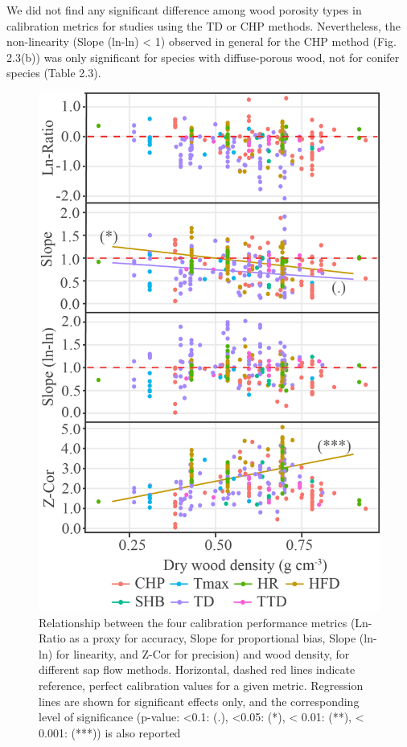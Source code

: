 \documentclass[11pt,twoside]{reedthesis}
\begin{document}
We did not find any significant difference among wood porosity types in
calibration metrics for studies using the TD or CHP methods.
Nevertheless, the non-linearity (Slope (ln-ln) \textless{} 1) observed
in general for the CHP method (Fig. 2.3(b)) was only significant for
species with diffuse-porous wood, not for conifer species (Table
2.3).\par
\begin{figure}[hbt!]

{\centering \includegraphics[width=0.55\linewidth]{figure/CH2/DENSITY} 

}

\caption[Relationship between the four calibration performance and wood density, for different sap flow methods.]{Relationship between the four calibration performance metrics (Ln-Ratio as a proxy for accuracy, Slope for proportional bias, Slope (ln-ln) for linearity, and Z-Cor for precision) and wood density, for different sap flow methods. Horizontal, dashed red lines indicate reference, perfect calibration values for a given metric. Regression lines are shown for significant effects only, and the corresponding level of significance (p-value: <0.1: (.), <0.05: (*), < 0.01: (**), < 0.001: (***)) is also reported }\label{fig:ch2fig4}
\end{figure}
\end{document}
